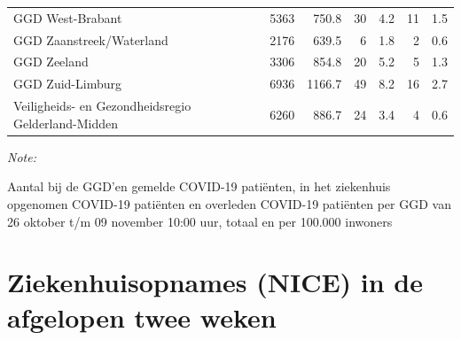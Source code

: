 \documentclass[
  english,
  man,floatsintext]{apa6}
\begin{document}
\begin{table}
\begin{threeparttable}
\begin{tabular}{lrrrrrr}
GGD West-Brabant & 5363 & 750.8 & 30 & 4.2 & 11 & 1.5\\
GGD Zaanstreek/Waterland & 2176 & 639.5 & 6 & 1.8 & 2 & 0.6\\
GGD Zeeland & 3306 & 854.8 & 20 & 5.2 & 5 & 1.3\\
GGD Zuid-Limburg & 6936 & 1166.7 & 49 & 8.2 & 16 & 2.7\\
Veiligheids- en Gezondheidsregio Gelderland-Midden & 6260 & 886.7 & 24 & 3.4 & 4 & 0.6\\
\bottomrule
\end{tabular}
\begin{tablenotes}
\item \textit{Note: } 
\item Aantal bij de GGD’en gemelde COVID-19 patiënten, in het ziekenhuis opgenomen COVID-19 patiënten en overleden COVID-19 patiënten per GGD van 26 oktober t/m 09 november 10:00 uur, totaal en per 100.000 inwoners
\end{tablenotes}
\end{threeparttable}
\endgroup{}
\end{table}

\newpage

\hypertarget{ziekenhuisopnames-nice-in-de-afgelopen-twee-weken}{%
\section{Ziekenhuisopnames (NICE) in de afgelopen twee weken}\label{ziekenhuisopnames-nice-in-de-afgelopen-twee-weken}}
\end{document}
